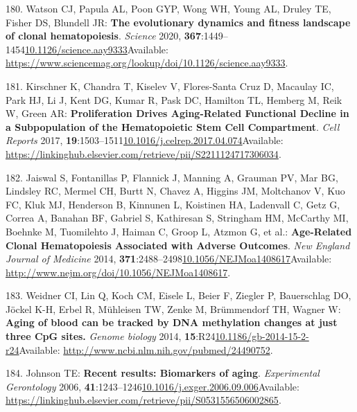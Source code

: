 \documentclass[
]{book}
\begin{document}
\leavevmode\hypertarget{ref-Watson2020}{}%
180. Watson CJ, Papula AL, Poon GYP, Wong WH, Young AL, Druley TE, Fisher DS, Blundell JR: \textbf{The evolutionary dynamics and fitness landscape of clonal hematopoiesis}. \emph{Science} 2020, \textbf{367}:1449--1454\href{https://doi.org/10.1126/science.aay9333}{10.1126/science.aay9333}Available: \url{https://www.sciencemag.org/lookup/doi/10.1126/science.aay9333}.

\leavevmode\hypertarget{ref-Kirschner2017}{}%
181. Kirschner K, Chandra T, Kiselev V, Flores-Santa Cruz D, Macaulay IC, Park HJ, Li J, Kent DG, Kumar R, Pask DC, Hamilton TL, Hemberg M, Reik W, Green AR: \textbf{Proliferation Drives Aging-Related Functional Decline in a Subpopulation of the Hematopoietic Stem Cell Compartment}. \emph{Cell Reports} 2017, \textbf{19}:1503--1511\href{https://doi.org/10.1016/j.celrep.2017.04.074}{10.1016/j.celrep.2017.04.074}Available: \url{https://linkinghub.elsevier.com/retrieve/pii/S2211124717306034}.

\leavevmode\hypertarget{ref-Jaiswal2014c}{}%
182. Jaiswal S, Fontanillas P, Flannick J, Manning A, Grauman PV, Mar BG, Lindsley RC, Mermel CH, Burtt N, Chavez A, Higgins JM, Moltchanov V, Kuo FC, Kluk MJ, Henderson B, Kinnunen L, Koistinen HA, Ladenvall C, Getz G, Correa A, Banahan BF, Gabriel S, Kathiresan S, Stringham HM, McCarthy MI, Boehnke M, Tuomilehto J, Haiman C, Groop L, Atzmon G, et al.: \textbf{Age-Related Clonal Hematopoiesis Associated with Adverse Outcomes}. \emph{New England Journal of Medicine} 2014, \textbf{371}:2488--2498\href{https://doi.org/10.1056/NEJMoa1408617}{10.1056/NEJMoa1408617}Available: \url{http://www.nejm.org/doi/10.1056/NEJMoa1408617}.

\leavevmode\hypertarget{ref-Weidner2014}{}%
183. Weidner CI, Lin Q, Koch CM, Eisele L, Beier F, Ziegler P, Bauerschlag DO, Jöckel K-H, Erbel R, Mühleisen TW, Zenke M, Brümmendorf TH, Wagner W: \textbf{Aging of blood can be tracked by DNA methylation changes at just three CpG sites.} \emph{Genome biology} 2014, \textbf{15}:R24\href{https://doi.org/10.1186/gb-2014-15-2-r24}{10.1186/gb-2014-15-2-r24}Available: \url{http://www.ncbi.nlm.nih.gov/pubmed/24490752}.

\leavevmode\hypertarget{ref-Johnson2006}{}%
184. Johnson TE: \textbf{Recent results: Biomarkers of aging}. \emph{Experimental Gerontology} 2006, \textbf{41}:1243--1246\href{https://doi.org/10.1016/j.exger.2006.09.006}{10.1016/j.exger.2006.09.006}Available: \url{https://linkinghub.elsevier.com/retrieve/pii/S0531556506002865}.
\end{document}
